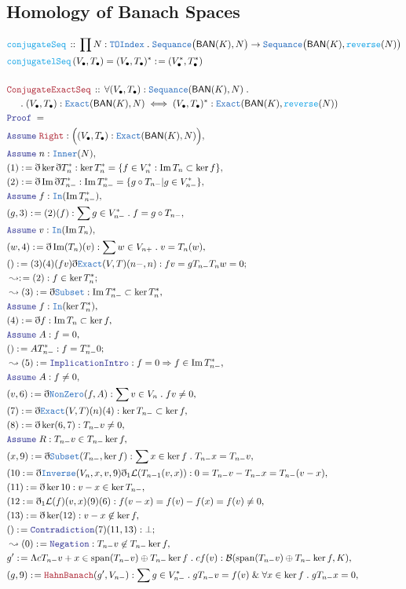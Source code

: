 \documentclass[12pt]{scrartcl}
\newcommand{\TYPE}[1]{\textcolor{NavyBlue}{\mathtt{#1}}}
\newcommand{\FUNC}[1]{\textcolor{Cerulean}{\mathtt{#1}}}
\newcommand{\LOGIC}[1]{\textcolor{Blue}{\mathtt{#1}}}
\newcommand{\THM}[1]{\textcolor{Maroon}{\mathtt{#1}}}
\renewcommand{\.}{\; . \;}
\newcommand{\de}{: \kern 0.1pc =}
\newcommand{\Act}[1]{\left( #1 \right)}
\newcommand{\Theorem}[2]{& \THM{#1} \, :: \, #2 \\ & \Proof = \\ }
\newcommand{\DeclareFunc}[2]{& \FUNC{#1} \, :: \, #2 \\}
\newcommand{\DefineNamedFunc}[4]{&  \FUNC{#1}\Act{#2} = #3 \de #4 \\}
\newcommand{\NewLine}{\\ & \kern 1pc}
\newcommand{\Page}[1]{\begin{align*} #1 \end{align*} \newpage   }
\newcommand{ \bd }{ \ByDef }
\renewcommand{\And}{\; \& \;}
\DeclareMathOperator*{\im}{Im}
\newcommand{\Say}[3]{& #1 \de #2 : #3, \\}
\newcommand{\Conclude}[3]{& #1 \de #2 : #3; \\}
\newcommand{\Derive}[3]{& \leadsto #1 \de #2 : #3, \\}
\newcommand{\DeriveConclude}[3]{& \leadsto #1 \de #2 : #3 ; \\}
\newcommand{\A}{\LOGIC{Assume} \;}
\newcommand{\Assume}[2]{& \A #1 : #2, \\}
\newcommand{\ByDef}{\eth}
\newcommand{\Proof}{\LOGIC{Proof} \; }
\DeclareMathOperator{\Span}{span}
\renewcommand{\L}{\mathcal{L}}
\newcommand{\BAN}{\textsf{BAN}}
\newcommand{\B}{\mathcal{B}}
\begin{document}
\subsection{Homology of Banach Spaces}
\Page{
\DeclareFunc{conjugateSeq}{\prod N : \TYPE{TOIndex} \. \TYPE{Sequance}\big(\BAN(K),N \big) \to \TYPE{Sequance}\big(\BAN(K), \FUNC{reverse}(N)\big)}
\DefineNamedFunc{conjugatelSeq}{V_\bullet,T_\bullet}{(V_\bullet,T_\bullet)^*}{(V^*_\bullet, T^*_\bullet)}
\\
\Theorem{ConjugateExactSeq}{ \forall (V_{\bullet},T_{\bullet}) : \TYPE{Sequance}(\BAN(K),N) \.
 \NewLine \.
  (V_{\bullet},T_{\bullet}) : \TYPE{Exact}(\BAN(K),N) \iff (V_{\bullet},T_{\bullet})^* : \TYPE{Exact}(\BAN(K),\FUNC{reverse}(N))}
\Assume{\THM{Right}}{\Big(   (V_{\bullet},T_{\bullet}) : \TYPE{Exact}(\BAN(K),N)  \Big)}
\Assume{n}{\TYPE{Inner}(N)}
\Say{(1)}{\bd \ker \bd T^*_n}{\ker T^*_n = \{ f \in V^*_{n  } : \im T_n \subset \ker f  \}}
\Say{(2)}{\bd \im \bd T^*_{n-}}{\im T^*_{n - } = \{  g \circ T_{n-}  | g \in V^*_{n - }    \}}
\Assume{f}{\TYPE{In}(\im T^*_{n-})}
\Say{(g,3)}{(2)(f)}{\sum g \in V^*_{n-} \. f = g \circ T_{n-}}
\Assume{v}{\TYPE{In}(\im T_n)}
\Say{(w,4)}{\bd \im (T_n)(v)}{\sum w \in V_{n+} \. v = T_n(w)}
\Conclude{()}{ (3)(4)(fv) \bd \TYPE{Exact}(V,T)(n-,n)}{fv = g T_{n-}T_n w = 0 }
\DeriveConclude{}{(2)}{f \in \ker T^*_n}
\Derive{(3)}{\bd \TYPE{Subset}}{ \im T^*_{n-} \subset \ker T^*_n  }
\Assume{f}{\TYPE{In}(\ker  T^*_{n})}
\Say{(4)}{\bd f}{\im T_n \subset \ker f }
\Assume{A}{f = 0}
\Conclude{()}{AT^*_{n-}}{f = T^*_{n-}0}
\Derive{(5)}{\LOGIC{ImplicationIntro}}{f = 0 \Rightarrow f \in \im T^*_{n-}}
\Assume{A}{f \neq 0}
\Say{(v,6)}{\bd \TYPE{NonZero}(f,A)}{\sum v \in V_n \. f v \neq 0}
\Say{(7)}{\bd \TYPE{Exact}(V,T)(n) (4) }{ \ker T_{n-} \subset \ker f }
\Say{(8)}{\bd \ker (6,7)}{ T_{n-}v \neq 0}
\Assume{R}{T_{n-}v \in T_{n-} \ker f}
\Say{(x,9)}{\bd \TYPE{Subset}(T_{n-}, \ker f)}{\sum x \in \ker f \.  T_{n-}x = T_{n-}v}
\Say{(10}{ \bd \TYPE{Inverse}(V_n,x,v,9)\bd_1 \L(T_{n-1}(v,x))}{0 = T_{n-}v - T_{n-}x = T_{n-}(v-x)}
\Say{(11)}{\bd \ker 10}{ v - x \in \ker T_{n-}}
\Say{(12}{\bd_1 \L(f)(v,x)(9)(6)}{ f(v - x) = f(v) - f(x) = f(v) \neq 0 }
\Say{(13)}{\bd \ker (12)}{v -x \not \in \ker f}
\Conclude{()}{\LOGIC{Contradiction}(7)(11,13)}{\bot}
\Derive{(0)}{\LOGIC{Negation}}{T_{n-}v \not \in T_{n-} \ker f}
\Say{g'}{\Lambda cT_{n-} v + x \in \Span(T_{n-} v) \oplus T_{n-}\ker f \. c f(v)}{ \B(\Span(T_{n-} v) \oplus T_{n-}\ker f,K)}
\Say{(g,9)}{\THM{HahnBanach}(g',V_{n-})}{\sum g \in V_{n-}^* \. g T_{n-} v = f(v)
 \And \forall x \in \ker f \. g T_{n-} x  = 0
}
}
\end{document}
